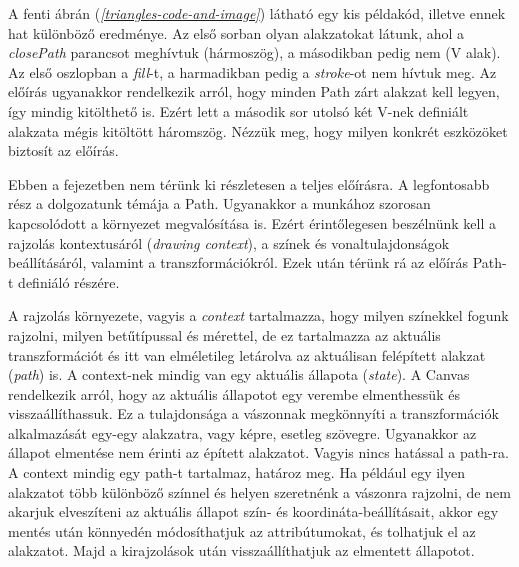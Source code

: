 \documentclass[12pt]{report}
\theoremstyle{definition}
\newcommand{\inenglish}[1]{\textsl{#1}}
\newcommand{\func}[1]{{\textsl{#1}}}
\begin{document}
A fenti ábrán (\emph{\ref{triangles-code-and-image}}) látható egy kis példakód,
illetve ennek hat különböző eredménye. Az első sorban olyan alakzatokat látunk,
ahol a \func{closePath} parancsot meghívtuk (hármoszög), a másodikban pedig nem
(V alak). Az első oszlopban a \func{fill}-t, a harmadikban pedig a
\func{stroke}-ot nem hívtuk meg. Az előírás ugyanakkor rendelkezik arról, hogy
minden Path zárt alakzat kell legyen, így mindig kitölthető is. Ezért lett a
második sor utolsó két V-nek definiált alakzata mégis kitöltött háromszög.
Nézzük meg, hogy milyen konkrét eszközöket biztosít az előírás.

Ebben a fejezetben nem térünk ki részletesen a teljes előírásra. A legfontosabb
rész a dolgozatunk témája a Path. Ugyanakkor a munkához szorosan kapcsolódott a
környezet megvalósítása is. Ezért érintőlegesen beszélnünk kell a rajzolás
kontextusáról (\inenglish{drawing context}), a színek és vonaltulajdonságok
beállításáról, valamint a transzformációkról. Ezek után térünk rá az előírás
Path-t definiáló részére.

A rajzolás környezete, vagyis a \emph{context} tartalmazza, hogy milyen
színekkel fogunk rajzolni, milyen betűtípussal és mérettel, de ez tartalmazza
az aktuális transzformációt és itt van elméletileg letárolva az aktuálisan
felépített alakzat (\inenglish{path}) is. A context-nek mindig van egy aktuális
állapota (\inenglish{state}). A Canvas rendelkezik arról, hogy az aktuális
állapotot egy verembe elmenthessük és visszaállíthassuk. Ez a tulajdonsága a
vászonnak megkönnyíti a transzformációk alkalmazását egy-egy alakzatra, vagy
képre, esetleg szövegre. Ugyanakkor az állapot elmentése nem érinti az épített
alakzatot. Vagyis nincs hatással a path-ra. A context mindig egy path-t
tartalmaz, határoz meg. Ha például egy ilyen alakzatot több különböző színnel
és helyen szeretnénk a vászonra rajzolni, de nem akarjuk elveszíteni az
aktuális állapot szín- és koordináta-beállításait, akkor egy mentés után
könnyedén módosíthatjuk az attribútumokat, és tolhatjuk el az alakzatot. Majd a
kirajzolások után visszaállíthatjuk az elmentett állapotot.
\end{document}
